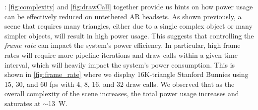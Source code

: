 :
%
\figs\ref{fig:complexity} and \ref{fig:drawCall} together provide us hints
on how power usage can be effectively reduced on untethered AR headsets.
%
%
As shown previously, a scene that requires many triangles, either due to a single complex object or many simpler objects, will result in high power usage. This suggests that controlling the \emph{frame rate} can impact the system's power efficiency. In particular, high frame rates will require more pipeline iterations and draw calls within a given time interval, which will heavily impact the system's power consumption. This is shown in \fig\ref{fig:frame_rate} where we display 16K-triangle Stanford Bunnies using 15, 30, and 60 fps with 4, 8, 16, and 32 draw calls. We observed that as the overall complexity of the scene increases, the total power usage increases and saturates at $\sim$13~W.


%

